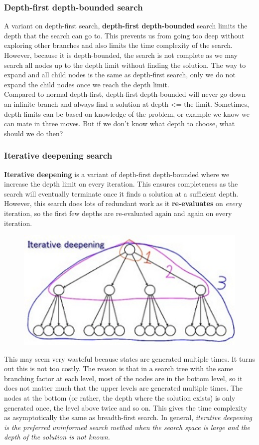 \documentclass{article}
\newcommand{\n}[0]{\\[\baselineskip]}
\begin{document}
\subsubsection{Depth-first depth-bounded search}
A variant on depth-first search, \textbf{depth-first depth-bounded} search limits the depth that the search can go to. This prevents us from going too deep without exploring other branches and also limits the time complexity of the search. However, because it is depth-bounded, the search is not complete as we may search all nodes up to the depth limit without finding the solution. The way to expand and all child nodes is the same as depth-first search, only we do not expand the child nodes once we reach the depth limit. 
\n
Compared to normal depth-first, depth-first depth-bounded will never go down an infinite branch and always find a solution at depth <= the limit. Sometimes, depth limits can be based on knowledge of the problem, or example we know we can mate in three moves. But if we don't know what depth to choose, what should we do then?
\subsubsection{Iterative deepening search}
\textbf{Iterative deepening} is a variant of depth-first depth-bounded where we increase the depth limit on every iteration. This ensures completeness as the search will eventually terminate once it finds a solution at a sufficient depth. However, this search does lots of redundant work as it \textbf{re-evaluates} on \textit{every} iteration, so the first few depths are re-evaluated again and again on every iteration.
\begin{figure}[H]
\centering
\includegraphics[width=1\textwidth, keepaspectratio]{imgs/iterative-deepening.jpg} 
\end{figure}
\noindent
This may seem very wasteful because states are generated multiple times. It turns out this is not too costly. The reason is that in a search tree with the same branching factor at each level, most of the nodes are in the bottom level, so it does not matter much that the upper levels are generated multiple times. The nodes at the bottom (or rather, the depth where the solution exists) is only generated once, the level above twice and so on. This gives the time complexity as asymptotically the same as breadth-first search. In general, \textit{iterative deepening is the preferred uninformed search method when the search space is large and the depth of the solution is not known.}
\end{document}
